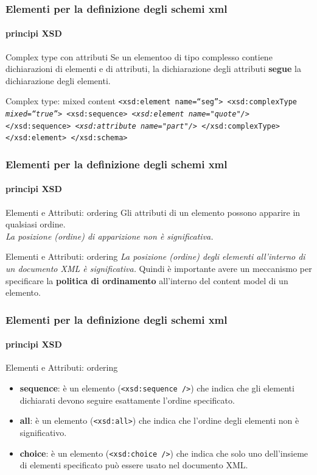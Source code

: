 \begin{frame}
	\frametitle{Elementi per la definizione degli schemi xml}
	\framesubtitle{principi XSD}
	\addtocounter{nframe}{1}

	\begin{block}{Complex type con attributi}
		Se un elementoo di tipo complesso contiene dichiarazioni di elementi e di attributi, la dichiarazione degli attributi \textbf{segue} la dichiarazione degli elementi.
	\end{block}

	\begin{block}{Complex type: mixed content}
		\texttt{<xsd:element name=``seg''>
			<xsd:complexType \textit{mixed=``true''}>
			<xsd:sequence>
				\emph{<xsd:element name="quote"/>}
			</xsd:sequence>
			\emph{<xsd:attribute name="part"/>}
			</xsd:complexType>
			</xsd:element>
			</xsd:schema>}
	\end{block}
\end{frame}

\begin{frame}
	\frametitle{Elementi per la definizione degli schemi xml}
	\framesubtitle{principi XSD}
	\addtocounter{nframe}{1}

	\begin{block}{Elementi e Attributi: ordering}
		Gli attributi di un elemento possono apparire in qualsiasi ordine.
		\\\textit{La posizione (ordine) di apparizione non è significativa.}

	\end{block}

	\begin{block}{Elementi e Attributi: ordering}
		\textit{La posizione (ordine) degli elementi all'interno di un documento XML è significativa.}
		Quindi è importante avere un meccanismo per specificare la \textbf{politica di ordinamento} all'interno del content model di un elemento.
	\end{block}
\end{frame}


\begin{frame}
	\frametitle{Elementi per la definizione degli schemi xml}
	\framesubtitle{principi XSD}
	\addtocounter{nframe}{1}

	\begin{block}{Elementi e Attributi: ordering}
		\begin{itemize}
			\item \textbf{sequence}: è un elemento (\texttt{<xsd:sequence />}) che indica che gli elementi dichiarati devono seguire esattamente l'ordine specificato.
			\item \textbf{all}: è un elemento (\texttt{<xsd:all>}) che indica che l'ordine degli elementi non è significativo.
			\item \textbf{choice}: è un elemento (\texttt{<xsd:choice />}) che indica che solo uno dell'insieme di elementi specificato può essere usato nel documento XML.
		\end{itemize}
	\end{block}
\end{frame}

